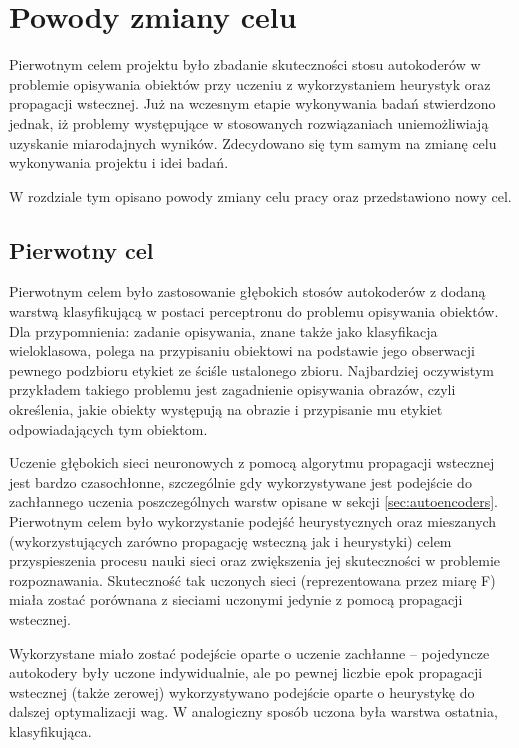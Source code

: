\documentclass[11pt,a4paper,oneside]{report}
\begin{document}
\chapter{Powody zmiany celu}

\label{chapter:david-bowie} %




Pierwotnym celem projektu było zbadanie skuteczności stosu autokoderów w problemie opisywania obiektów przy uczeniu z wykorzystaniem heurystyk oraz propagacji wstecznej. Już na wczesnym etapie wykonywania badań stwierdzono jednak, iż problemy występujące w stosowanych rozwiązaniach uniemożliwiają uzyskanie miarodajnych wyników. Zdecydowano się tym samym na zmianę celu wykonywania projektu i idei badań. 

W rozdziale tym opisano powody zmiany celu pracy oraz przedstawiono nowy cel.

\section{Pierwotny cel}

Pierwotnym celem było zastosowanie głębokich stosów autokoderów z dodaną warstwą klasyfikującą w postaci perceptronu do problemu opisywania obiektów. Dla przypomnienia: zadanie opisywania, znane także jako klasyfikacja wieloklasowa, polega na przypisaniu obiektowi na podstawie jego obserwacji pewnego podzbioru etykiet ze ściśle ustalonego zbioru. Najbardziej oczywistym przykładem takiego problemu jest zagadnienie opisywania obrazów, czyli określenia, jakie obiekty występują na obrazie i przypisanie mu etykiet odpowiadających tym obiektom. 

Uczenie głębokich sieci neuronowych z pomocą algorytmu propagacji wstecznej jest bardzo czasochłonne, szczególnie gdy wykorzystywane jest podejście do zachłannego uczenia poszczególnych warstw opisane w sekcji \ref{sec:autoencoders}. Pierwotnym celem było wykorzystanie podejść heurystycznych oraz mieszanych (wykorzystujących zarówno propagację wsteczną jak i heurystyki) celem przyspieszenia procesu nauki sieci oraz zwiększenia jej skuteczności w problemie rozpoznawania. Skuteczność tak uczonych sieci (reprezentowana przez miarę F) miała zostać porównana z sieciami uczonymi jedynie z pomocą propagacji wstecznej.

Wykorzystane miało zostać podejście oparte o uczenie zachłanne -- pojedyncze autokodery były uczone indywidualnie, ale po pewnej liczbie epok propagacji wstecznej (także zerowej) wykorzystywano podejście oparte o heurystykę do dalszej optymalizacji wag. W analogiczny sposób uczona była warstwa ostatnia, klasyfikująca.
\end{document}
